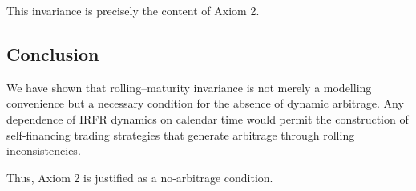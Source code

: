 \documentclass[12pt]{article}
\theoremstyle{statementstyle}
\begin{document}
\begin{appendices}
This invariance is precisely the content of Axiom 2.

\subsection{Conclusion}
\label{D.8}

We have shown that rolling--maturity invariance is not merely a modelling convenience but a necessary condition for the absence of dynamic arbitrage. Any dependence of IRFR dynamics on calendar time would permit the construction of self-financing trading strategies that generate arbitrage through rolling inconsistencies.

Thus, Axiom 2 is justified as a no-arbitrage condition.

\end{appendices}
\end{document}
